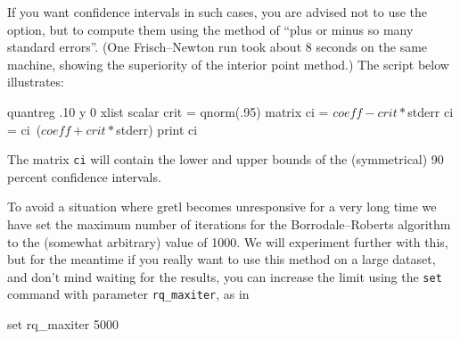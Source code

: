 If you want confidence intervals in such cases, you are advised not to
use the  option, but to compute them using the
method of ``plus or minus so many standard errors''.  (One
Frisch--Newton run took about 8 seconds on the same machine, showing
the superiority of the interior point method.)  The script below
illustrates:
%
\begin{code}
quantreg .10 y 0 xlist
scalar crit = qnorm(.95)
matrix ci = $coeff - crit * $stderr
ci = ci~($coeff + crit * $stderr)
print ci
\end{code}
%
The matrix \texttt{ci} will contain the lower and upper bounds of the
(symmetrical) 90 percent confidence intervals.

To avoid a situation where gretl becomes unresponsive for a very
long time we have set the maximum number of iterations for the
Borrodale--Roberts algorithm to the (somewhat arbitrary) value of
1000.  We will experiment further with this, but for the meantime if
you really want to use this method on a large dataset, and don't mind
waiting for the results, you can increase the limit using the
\texttt{set} command with parameter \verb|rq_maxiter|, as in
\begin{code}
set rq_maxiter 5000
\end{code}











